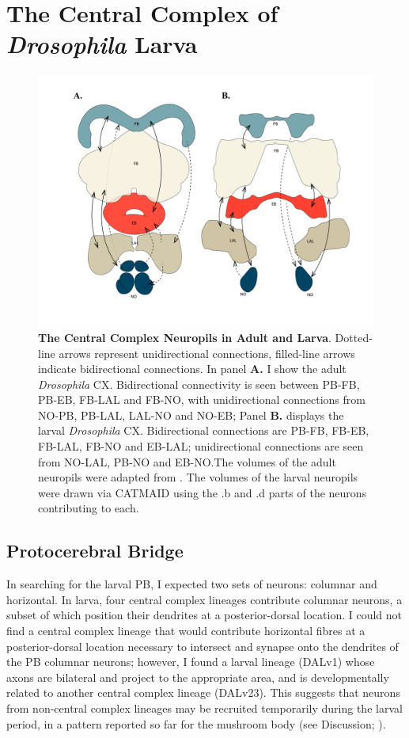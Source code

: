 \section{The Central Complex of \textit{Drosophila} Larva}
\label{CXLarva}
    \begin{figure}[H]
        \centering
        \includegraphics[width=12cm]{Figs/CX/cxdiagram.pdf}
        \caption[The Central Complex Neuropils in Adult and Larva]{\textbf{The Central Complex Neuropils in Adult and Larva}. Dotted-line arrows represent unidirectional connections, filled-line arrows indicate bidirectional connections. In panel \textbf{A.} I show the adult \textit{\textit{Drosophila}} CX. Bidirectional connectivity is seen between PB-FB, PB-EB, FB-LAL and FB-NO, with unidirectional connections from NO-PB, PB-LAL, LAL-NO and NO-EB; Panel \textbf{B.} displays the larval \textit{Drosophila} CX. Bidirectional connections are  PB-FB, FB-EB, FB-LAL, FB-NO and EB-LAL; unidirectional connections are seen from NO-LAL, PB-NO and EB-NO.The volumes of the adult neuropils were adapted from \citep{franconville2018building}.
        The volumes of the larval neuropils were drawn via CATMAID using the .b and .d parts of the neurons contributing to each.}
        \label{cxdiagram}
    \end{figure}

    \subsection{Protocerebral Bridge}
    \label{PB}
        In searching for the larval PB, I expected two sets of neurons: columnar and horizontal. In larva, four central complex lineages contribute columnar neurons, a subset of which position their dendrites at a posterior-dorsal location. I could not find a central complex lineage that would contribute horizontal fibres at a posterior-dorsal location necessary to intersect and synapse onto the dendrites of the PB columnar neurons; however, I found a larval lineage (DALv1) whose axons are bilateral and project to the appropriate area, and is developmentally related to another central complex lineage (DALv23). This suggests that neurons from non-central complex lineages may be recruited temporarily during the larval period, in a pattern reported so far for the mushroom body (see Discussion; \citep{truman2023metamorphosis}). 

